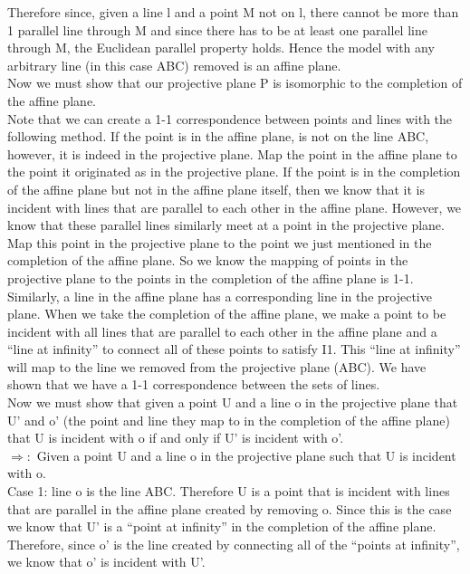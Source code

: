 \documentclass[12pt,letterpaper]{article}
\begin{document}
Therefore since, given a line l and a point M not on l, there cannot be more than 1 parallel line through M and since there has to be at least one parallel line through M, the Euclidean parallel property holds.  Hence the model with any arbitrary line (in this case ABC) removed is an affine plane.\\



Now we must show that our projective plane P is isomorphic to the completion of the affine plane.\\

Note that we can create a 1-1 correspondence between points and lines with the following method.  If the point is in the affine plane, is not on the line ABC, however, it is indeed in the projective plane.  Map the point in the affine plane to the point it originated as in the projective plane.  If the point is in the completion of the affine plane but not in the affine plane itself, then we know that it is incident with lines that are parallel to each other in the affine plane.  However, we know that these parallel lines similarly meet at a point in the projective plane.  Map this point in the projective plane to the point we just mentioned in the completion of the affine plane.  So we know the mapping of points in the projective plane to the points in the completion of the affine plane is 1-1.\\

Similarly, a line in the affine plane has a corresponding line in the projective plane.  When we take the completion of the affine plane, we make a point to be incident with all lines that are parallel to each other in the affine plane and a ``line at infinity'' to connect all of these points to satisfy I1.  This ``line at infinity'' will map to the line we removed from the projective plane (ABC). We have shown that we have a 1-1 correspondence between the sets of lines.  \\

Now we must show that given a point U and a line o in the projective plane that U' and o' (the point and line they map to in the completion of the affine plane) that U is incident with o if and only if U' is incident with o'.  \\

$\Rightarrow:$ Given a point U and a line o in the projective plane such that U is incident with o.\\

Case 1: line o is the line ABC.  Therefore U is a point that is incident with lines that are parallel in the affine plane created by removing o.  Since this is the case we know that U' is a ``point at infinity'' in the completion of the affine plane.  Therefore, since o' is the line created by connecting all of the ``points at infinity'', we know that o' is incident with U'.\\
\end{document}
